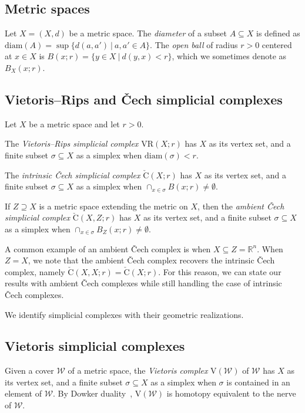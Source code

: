 \documentclass[11pt, reqno, english]{amsart}
\theoremstyle{plain}
\theoremstyle{definition}
\theoremstyle{myremark}
\newcommand{\R}{\mathbb{R}}
\newcommand{\cW}{\mathcal{W}}
\newcommand{\diam}{\mathrm{diam}}
\newcommand{\vr}[2]{\mathrm{VR}(#1;#2)}
\newcommand{\viet}[1]{\mathrm{V}(#1)}
\newcommand{\cech}[2]{\mathrm{\check{C}}(#1;#2)}
\newcommand{\acech}[3]{\mathrm{\check{C}}(#1,#2;#3)}
\begin{document}
\subsection{Metric spaces}

Let $X=(X,d)$ be a metric space.
The \emph{diameter} of a subset $A\subseteq X$ is defined as $\diam(A)=\sup\{d(a,a')~|~a,a'\in A\}$.
The \emph{open ball} of radius $r>0$ centered at $x\in X$ is $B(x;r)=\{y\in X~|~d(y,x)<r\}$, which we sometimes denote as $B_X(x;r)$.


\subsection{Vietoris--Rips and \v{C}ech simplicial complexes}

Let $X$ be a metric space and let $r>0$.

The \emph{Vietoris--Rips simplicial complex $\vr{X}{r}$} has $X$ as its vertex set, and a finite subset $\sigma\subseteq X$ as a simplex when $\diam(\sigma)<r$.

The \emph{intrinsic \v{C}ech simplicial complex} $\cech{X}{r}$ has $X$ as its vertex set, and a finite subset $\sigma\subseteq X$ as a simplex when $\cap_{x\in \sigma}B(x;r)\neq\emptyset$.

If $Z\supseteq X$ is a metric space extending the metric on $X$, then the \emph{ambient \v{C}ech simplicial complex} $\acech{X}{Z}{r}$ has $X$ as its vertex set, and a finite subset $\sigma\subseteq X$ as a simplex when $\cap_{x\in \sigma}B_Z(x;r)\neq\emptyset$.

A common example of an ambient \v{C}ech complex is when $X\subseteq Z=\R^n$.
When $Z=X$, we note that the ambient \v{C}ech complex recovers the intrinsic \v{C}ech complex, namely $\acech{X}{X}{r}=\cech{X}{r}$.
For this reason, we can state our results with ambient \v{C}ech complexes while still handling the case of intrinsic \v{C}ech complexes.

We identify simplicial complexes with their geometric realizations.

\subsection{Vietoris simplicial complexes}
\label{ssec:vietoris}

Given a cover $\cW$ of a metric space, the \emph{Vietoris complex} $\viet{\cW}$ of $\cW$ has $X$ as its vertex set, and a finite subset $\sigma \subseteq X$ as a simplex when $\sigma$ is contained in an element of $\cW$.
By Dowker duality~\cite{dowker1952topology}, $\viet{\cW}$ is homotopy equivalent to the nerve of $\cW$.
\end{document}

